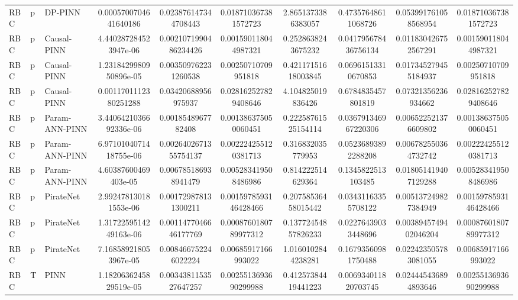\begin{landscape}
\begin{longtable}{lllccccccc}
 RBC &     p &        DP-PINN &  0.0005700704641640186 &   0.023876147344708443 &   0.018710367381572723 &   2.8651373386383057 &   0.47357648611068726 &  0.053991761058568954 &   0.018710367381572723 \\
 RBC &     p &    Causal-PINN &  4.440287284523947e-06 &  0.0021071990486234426 &   0.001590118044987321 &   0.2528638243675232 &  0.041795678436756134 &  0.011830426752567291 &   0.001590118044987321 \\
 RBC &     p &    Causal-PINN & 1.2318429980950896e-05 &   0.003509762231260538 &    0.00250710709951818 &  0.42117151618003845 &   0.06961513310670853 &  0.017345279455184937 &    0.00250710709951818 \\
 RBC &     p &    Causal-PINN &  0.0011701112380251288 &    0.03420688956975937 &   0.028162527829408646 &    4.104825019836426 &    0.6784835457801819 &   0.07321356236934662 &   0.028162527829408646 \\
 RBC &     p & Param-ANN-PINN & 3.4406421036692336e-06 &     0.0018548967782408 &   0.001386375050060451 &  0.22258761525154114 &  0.036791346967220306 &  0.006522521376609802 &   0.001386375050060451 \\
 RBC &     p & Param-ANN-PINN & 6.9710104071418755e-06 &  0.0026402671355754137 &   0.002224255120381713 &    0.316832035779953 &   0.05236893892288208 &  0.006782550364732742 &   0.002224255120381713 \\
 RBC &     p & Param-ANN-PINN &   4.60387600469403e-05 &   0.006785186938941479 &   0.005283419508486986 &    0.814222514629364 &    0.1345822513103485 &  0.018051419407129288 &   0.005283419508486986 \\
 RBC &     p &      PirateNet &  2.992478130181553e-06 &   0.001729878131300211 &  0.0015978593146428466 &  0.20758536458015442 &   0.03431163355708122 &  0.005137249827384949 &  0.0015978593146428466 \\
 RBC &     p &      PirateNet & 1.3172259514249163e-06 &  0.0011477046646177769 &  0.0008760180789977312 &  0.13772454857826233 &   0.02276439033448696 & 0.0038945749402046204 &  0.0008760180789977312 \\
 RBC &     p &      PirateNet &  7.168589218053967e-05 &   0.008466752246022224 &    0.00685917166993022 &   1.0160102844238281 &   0.16793560981750488 &  0.022423505783081055 &    0.00685917166993022 \\
 RBC &     T &           PINN & 1.1820636245829519e-05 &  0.0034381153527647257 &  0.0025513693690299988 &  0.41257384419441223 &  0.006934011820703745 &  0.024445436894893646 &  0.0025513693690299988 \\

\end{longtable}
\end{landscape}
